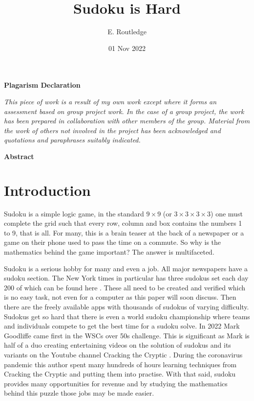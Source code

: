 \documentclass[a4paper,11pt]{report}
\author{E. Routledge}
\date{01 Nov 2022}
\title{Sudoku is Hard}
\newcounter{row}
\newcounter{col}
\begin{document}
\lstset{language=Python}

\begin{center}{\huge\textbf{Plagarism Declaration}}\end{center}
\textit{This piece of work is a result of my own work except where it forms an assessment based on group project work. In the case of a group project, the work has been prepared in collaboration with other members of the group. Material from the work of others not involved in the project has been acknowledged and quotations and paraphrases suitably indicated.}
\begin{center}{\textbf{Abstract}}\end{center}

\tableofcontents
\chapter{Introduction}

Sudoku is a simple logic game, in the standard $9 \times 9$ (or $3 \times 3 \times 3 \times 3$) one must complete the grid such that every row, column and box contains the numbers 1 to 9, that is all. For many, this is a brain teaser at the back of a newspaper or a game on their phone used to pass the time on a commute. So why is the mathematics behind the game important? The answer is multifaceted. 

Sudoku is a serious hobby for many and even a job. All major newspapers have a sudoku section. The New York times in particular has three sudokus set each day 200 of which can be found here \cite{Shortz2006}. These all need to be created and verified which is no easy task, not even for a computer as this paper will soon discuss. Then there are the freely available apps with thousands of sudokus of varying difficulty. Sudokus get so hard that there is even a world sudoku championship \cite{sudokuworldchampionship} where teams and individuals compete to get the best time for a sudoku solve. In 2022 Mark Goodliffe came first in the WSCs over 50s challenge. This is significant as Mark is half of a duo creating entertaining videos on the solution of sudokus and its variants on the Youtube channel Cracking the Cryptic \cite{crackingthecryptic}. During the coronavirus pandemic this author spent many hundreds of hours learning techniques from Cracking the Cryptic and putting them into practise. With that said, sudoku provides many opportunities for revenue and by studying the mathematics behind this puzzle those jobs may be made easier.
\end{document}

